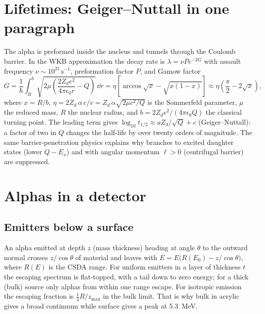 \section{Lifetimes: Geiger--Nuttall in one paragraph}
The alpha is preformed inside the nucleus and tunnels through the Coulomb barrier. In the WKB approximation the decay rate is $\lambda = \nu P e^{-2G}$ with assault frequency $\nu\sim10^{21}\,\mathrm{s^{-1}}$, preformation factor $P$, and Gamow factor
\begin{equation}
G = \frac{1}{\hbar}\int_R^{b}\sqrt{2\mu\left(\frac{2Z_d e^2}{4\pi\epsilon_0 r} - Q\right)}\,\dd r
= \eta\left[\arccos\sqrt{x} - \sqrt{x(1-x)}\right] \approx \eta\left(\frac{\pi}{2} - 2\sqrt{x}\right),
\end{equation}
where $x = R/b$, $\eta = 2Z_d\,\alpha\,c/v = Z_d\,\alpha\sqrt{2\mu c^2/Q}$ is the Sommerfeld parameter, $\mu$ the reduced mass, $R$ the nuclear radius, and $b = 2Z_d e^2/(4\pi\epsilon_0 Q)$ the classical turning point. The leading term gives $\log_{10} t_{1/2} \approx a Z_d/\sqrt{Q} + c$ (Geiger--Nuttall): a factor of two in $Q$ changes the half-life by over twenty orders of magnitude. The same barrier-penetration physics explains why branches to excited daughter states (lower $Q - E_x$) and with angular momentum $\ell > 0$ (centrifugal barrier) are suppressed.


\section{Alphas in a detector}
\subsection{Emitters below a surface}
An alpha emitted at depth $z$ (mass thickness) heading at angle $\theta$ to the outward normal crosses $z/\cos\theta$ of material and leaves with $E = E\big(R(E_0) - z/\cos\theta\big)$, where $R(E)$ is the CSDA range. For uniform emitters in a layer of thickness $t$ the escaping spectrum is flat-topped, with a tail down to zero energy; for a thick (bulk) source only alphas from within one range escape. For isotropic emission the escaping fraction is $\tfrac14 R/z_\text{max}$ in the bulk limit. That is why bulk  in acrylic gives a broad continuum while surface  gives a peak at \SI{5.3}{MeV}.

